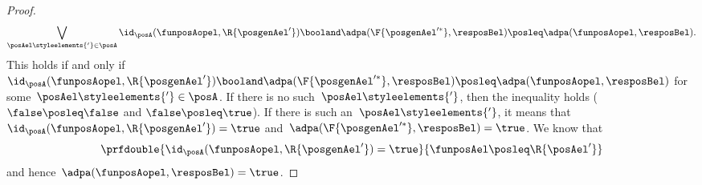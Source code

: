 \begin{proof}
\begin{equation*}
        \bigvee_{\posAel\styleelements{'}\in \posA}\id_\posA(\funposAopel,\R{\posgenAel'})\booland \adpa(\F{\posgenAel'^*},\resposBel) \posleq \adpa(\funposAopel,\resposBel).
    \end{equation*}
    This holds if and only if~$\id_\posA(\funposAopel,\R{\posgenAel'})\booland \adpa(\F{\posgenAel'^*},\resposBel) \posleq \adpa(\funposAopel,\resposBel)$ for some~$\posAel\styleelements{'}\in \posA$.
    If there is no such~$\posAel\styleelements{'}$, then the inequality holds ($\false \posleq \false$ and $\false \posleq \true$).
    If there is such an~$\posAel\styleelements{'}$, it means that~$\id_\posA(\funposAopel,\R{\posgenAel'})=\true$ and~$\adpa(\F{\posgenAel'^*},\resposBel)=\true$.
    We know that
    \begin{equation*}
        \prfdouble{\id_\posA(\funposAopel,\R{\posgenAel'})=\true}{\funposAel \posleq \R{\posAel'}}
    \end{equation*}
    and hence~$\adpa(\funposAopel,\resposBel)=\true$.
\end{proof}
